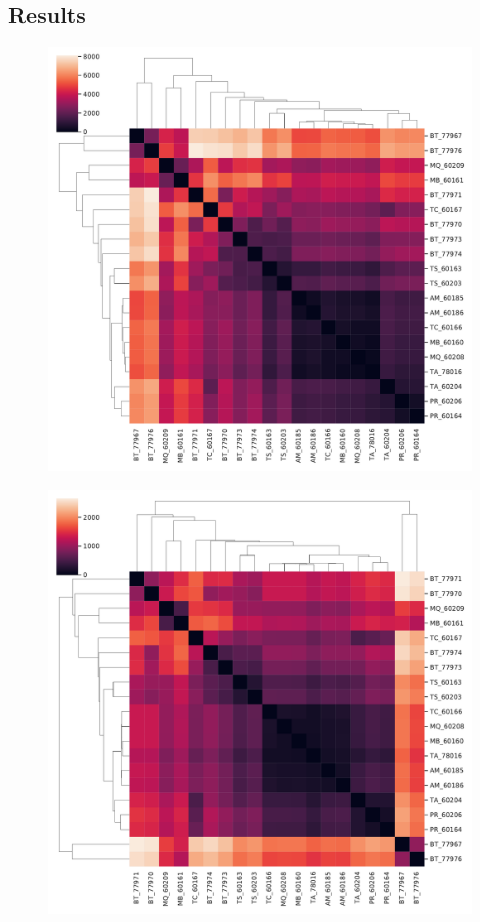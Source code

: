 \subsection{Results}
\begin{figure}[ht]
  \centering
  \includegraphics[scale=0.35]{clusters/wasserstein_h1_full.pdf}
  \caption{\label{fig:label} }
\end{figure}



\begin{figure}[ht]
  \centering
  \includegraphics[scale=0.35]{clusters/wasserstein_h2_full.pdf}
  \caption{\label{fig:label} }
\end{figure}

